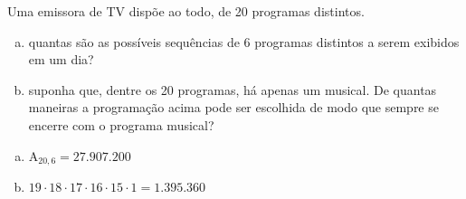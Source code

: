 \begin{ex}
  Uma emissora de TV dispõe ao todo, de 20 programas distintos.
    \begin{enumerate}[(a)]
    \item  quantas são as possíveis  sequências de 6 programas distintos a serem exibidos em um dia?
    \item  suponha que, dentre os 20 programas, há apenas um musical. De quantas maneiras a programação acima pode ser escolhida de modo que sempre se encerre com o programa musical?
    \end{enumerate}
      \begin{sol}
        \phantom{A}
          \begin{enumerate} [(a)]
              \item $\mathrm{A}_{{20},6}=27.907.200$
              \item $19\cdot18\cdot17\cdot16\cdot15\cdot1=1.395.360$
          \end{enumerate}
      \end{sol}
\end{ex}